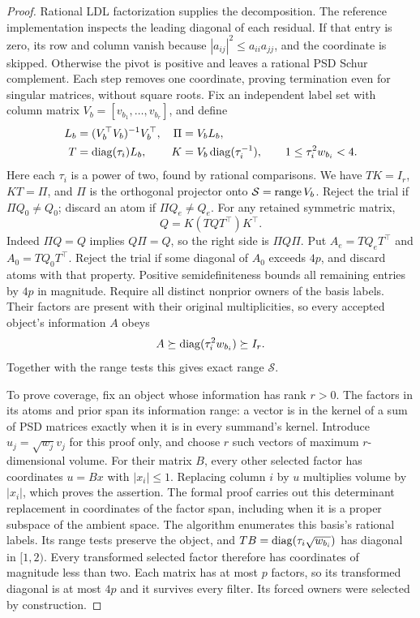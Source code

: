 \begin{proof}
Rational LDL factorization supplies the decomposition. The reference
implementation inspects the leading diagonal of each residual. If that
entry is zero, its row and column vanish because
$|a_{ij}|^2\le a_{ii}a_{jj}$, and the coordinate is skipped. Otherwise the
pivot is positive and leaves a rational PSD Schur complement. Each step
removes one coordinate, proving termination even for singular matrices,
without square roots. Fix an independent label set with column matrix
$V_b=[v_{b_1},\ldots,v_{b_r}]$, and define
\begin{align}
 L_b&=(V_b^\top V_b)^{-1}V_b^\top,&\Pi&=V_bL_b,\nonumber\\
 T&=\operatorname{diag}(\tau_i)L_b,&K&=V_b\operatorname{diag}(\tau_i^{-1}),
 \qquad 1\le\tau_i^2w_{b_i}<4.
 \label{eq:spectral-normalization}
\end{align}
Here each $\tau_i$ is a power of two, found by rational comparisons. We have
$TK=I_r$, $KT=\Pi$, and $\Pi$ is the orthogonal projector onto
$\mathcal S=\operatorname{range} V_b$. Reject the trial if $\Pi Q_0\ne Q_0$; discard
an atom if $\Pi Q_e\ne Q_e$. For any retained symmetric matrix,
\begin{equation}
 Q=K(TQT^\top)K^\top.
 \label{eq:spectral-reconstruction}
\end{equation}
Indeed $\Pi Q=Q$ implies $Q\Pi=Q$, so the right side is $\Pi Q\Pi$.
Put $A_e=TQ_eT^\top$ and $A_0=TQ_0T^\top$. Reject the trial if some
diagonal of $A_0$ exceeds $4p$, and discard atoms with that property.
Positive semidefiniteness bounds all remaining entries by $4p$ in magnitude.
Require all distinct nonprior owners of the basis labels. Their factors are present with their original multiplicities,
so every accepted object's information $A$ obeys
\begin{equation}
 A\succeq\operatorname{diag}(\tau_i^2w_{b_i})\succeq I_r.
 \label{eq:forced-lower-floor}
\end{equation}
Together with the range tests this gives exact range $\mathcal S$.

To prove coverage, fix an object whose information has rank $r>0$. The
factors in its atoms and prior span its information range: a vector is in
the kernel of a sum of PSD matrices exactly when it is in every summand's
kernel. Introduce $u_j=\sqrt{w_j}v_j$ for this proof only, and choose $r$
such vectors of maximum $r$-dimensional volume. For their matrix $B$, every
other selected factor has coordinates $u=Bx$ with $|x_i|\le1$. Replacing
column $i$ by $u$ multiplies volume by $|x_i|$, which proves the assertion.
The formal proof carries out this determinant replacement in coordinates
of the factor span, including when it is a proper subspace of the ambient
space. The algorithm enumerates this basis's rational labels. Its range tests
preserve the object, and $TB=\operatorname{diag}(\tau_i\sqrt{w_{b_i}})$ has diagonal in
$[1,2)$. Every transformed selected factor therefore has coordinates of
magnitude less than two. Each matrix has at most $p$ factors, so its
transformed diagonal is at most $4p$ and it survives every filter. Its forced
owners were selected by construction.


\end{proof}
